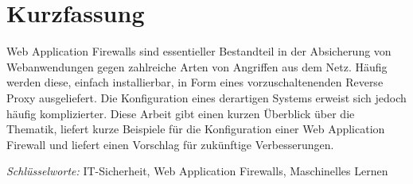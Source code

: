 

\section*{Kurzfassung}
Web Application Firewalls sind essentieller Bestandteil in der Absicherung von Webanwendungen gegen zahlreiche Arten von Angriffen aus dem Netz. Häufig werden diese, einfach installierbar, in Form eines vorzuschaltenenden Reverse Proxy ausgeliefert. Die Konfiguration eines derartigen Systems erweist sich jedoch häufig komplizierter. Diese Arbeit gibt einen kurzen Überblick über die Thematik, liefert kurze Beispiele für die Konfiguration einer Web Application Firewall und liefert einen Vorschlag für zukünftige Verbesserungen.

\emph{Schlüsselworte:} IT-Sicherheit, Web Application Firewalls, Maschinelles Lernen


